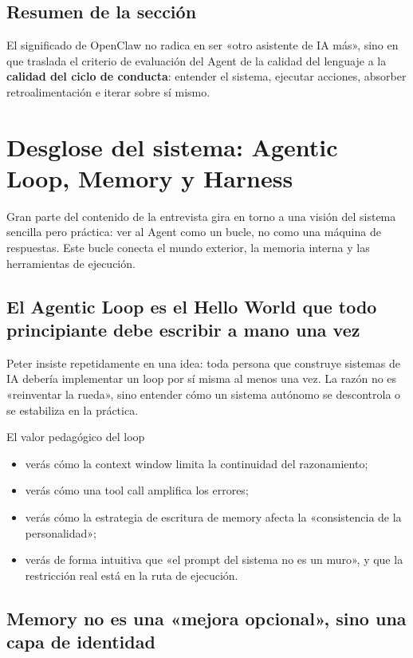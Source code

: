 \documentclass[a4paper]{article}
\begin{document}
\subsection{Resumen de la sección}
El significado de OpenClaw no radica en ser «otro asistente de IA más», sino en que traslada el criterio de evaluación del Agent de la calidad del lenguaje a la \textbf{calidad del ciclo de conducta}: entender el sistema, ejecutar acciones, absorber retroalimentación e iterar sobre sí mismo.

\section{Desglose del sistema: Agentic Loop, Memory y Harness}

Gran parte del contenido de la entrevista gira en torno a una visión del sistema sencilla pero práctica: ver al Agent como un bucle, no como una máquina de respuestas. Este bucle conecta el mundo exterior, la memoria interna y las herramientas de ejecución.

\subsection{El Agentic Loop es el Hello World que todo principiante debe escribir a mano una vez}

Peter insiste repetidamente en una idea: toda persona que construye sistemas de IA debería implementar un loop por sí misma al menos una vez. La razón no es «reinventar la rueda», sino entender cómo un sistema autónomo se descontrola o se estabiliza en la práctica.

\begin{importantbox}{El valor pedagógico del loop}
\begin{itemize}
    \item verás cómo la context window limita la continuidad del razonamiento;
    \item verás cómo una tool call amplifica los errores;
    \item verás cómo la estrategia de escritura de memory afecta la «consistencia de la personalidad»;
    \item verás de forma intuitiva que «el prompt del sistema no es un muro», y que la restricción real está en la ruta de ejecución.
\end{itemize}
\end{importantbox}

\subsection{Memory no es una «mejora opcional», sino una capa de identidad}
\end{document}
